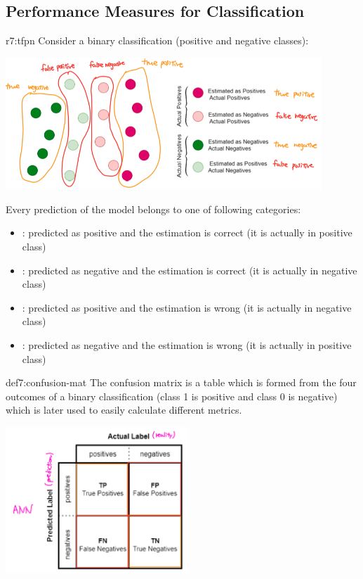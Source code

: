 \documentclass{tron}
\begin{document}
\subsection{Performance Measures for Classification}
\vspace{5pt}
\begin{remark}{r7:tfpn}
	Consider a binary classification (positive and negative classes):
	
	\includegraphics[width=450px]{Figs/Lec7/tfpn}
	
	Every prediction of the model belongs to one of following categories:
	\begin{itemize}
		\item \textbf{}: predicted as positive and the estimation is correct (it is actually in positive class)
		\item \textbf{}: predicted as negative and the estimation is correct (it is actually in negative class)
		\item {}: predicted as positive and the estimation is wrong (it is actually in negative class)
		\item {}: predicted as negative and the estimation is wrong (it is actually in positive class)
	\end{itemize}
\end{remark}

\begin{definition}{def7:confusion-mat}
	The confusion matrix is a table which is formed from the four outcomes of a binary classification (class 1 is positive and class 0 is negative) which is later used to easily calculate different metrics.
	
		\includegraphics[width=260px]{Figs/Lec7/conf-mat}
\end{definition}
\end{document}
